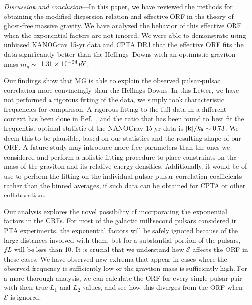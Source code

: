 \documentclass[prd,twocolumn,aps,psfig,nofootinbib,nobibnotes,superscriptaddress,preprintnumbers,times]{revtex4-2}
\newcommand{\eV}{\,{\rm eV}}
\begin{document}
\textit{Discussion and conclusion}---In this paper, we have reviewed the methods for obtaining the modified dispersion relation and effective ORF in the theory of ghost-free massive gravity. We have analyzed the behavior of this effective ORF when the exponential factors are not ignored. We were able to demonstrate using unbiased NANOGrav 15-yr data and CPTA DR1 that the effective ORF fits the data significantly better than the Hellings–Downs with an optimistic graviton mass $m_g \sim$ $1.31\times10^{-24} \eV$.

Our findings show that MG  is able to explain the observed pulsar-pulsar correlation more convincingly than the Hellings-Downs. In this Letter, we have not performed a rigorous fitting of the data, we simply took characteristic frequencies for comparison. A rigorous fitting to the full data in a different context has been done in Ref.\ \cite{Arjona:2024cex}, and the ratio that has been found to best fit the frequentist optimal statistic of the NANOGrav 15-yr data is $|{\bf k}|/k_0 \sim 0.73$. We deem this to be plausible, based on our statistics and the resulting shape of our ORF. A future study may introduce more free parameters than the ones we considered and perform a holistic fitting procedure to place constraints on the mass of the graviton and its relative energy densities. Additionally, it would be of use to perform the fitting on the individual pulsar-pulsar correlation coefficients rather than the binned averages, if such data can be obtained for CPTA or other collaborations. 

Our analysis explores the novel possibility of incorporating the exponential factors in the ORFs. For most of the galactic millisecond pulsars considered in PTA experiments, the exponential factors will be safely ignored because of the large distances involved with them, but for a substantial portion of the pulsars, $fL$ will be less than 10. It is crucial that we understand how $\mathcal{E}$ affects the ORF in these cases. We have observed new extrema that appear in cases where the observed frequency is sufficiently low or the graviton mass is sufficiently high. For a more thorough analysis, we can calculate the ORF for every single pulsar pair with their true $L_1$ and $L_2$ values, and see how this diverges from the ORF when $\mathcal{E}$ is ignored.
\end{document}
